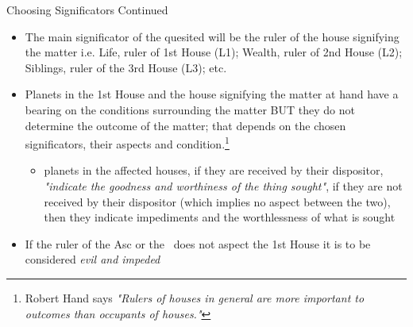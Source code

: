 \begin{frame}[t]{Choosing Significators Continued}
\begin{itemize}
\item The main significator of the quesited will be the ruler of the house signifying the matter i.e. Life, ruler of 1st House (L1); Wealth, ruler of 2nd House (L2); Siblings, ruler of the 3rd House (L3); etc.
\item Planets in the 1st House and the house signifying the matter at hand have a bearing on the conditions surrounding the matter BUT they do not determine the outcome of the matter; that depends on the chosen significators, their aspects and condition.\footnote{Robert Hand says \textsl{"Rulers of houses in general are more important to outcomes than occupants of houses."}}
	\begin{itemize}
		\item planets in the affected houses, if they are received by their dispositor, \textsl{"indicate the goodness and worthiness of the thing sought"}, if they are not received by their dispositor (which implies no aspect between the two), then they indicate impediments and the worthlessness of what is sought
	\end{itemize}
\item If the ruler of the Asc or the \Moon\ does not aspect the 1st House it is to be considered \textsl{evil and impeded}
\end{itemize}

\end{frame}
